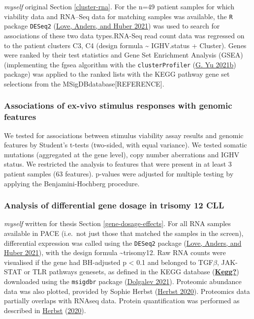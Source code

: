 \documentclass[11pt, a4paper, twosided]{book}
\begin{document}
\emph{myself} original
Section \ref{cluster-rna}. For the n=49 patient samples for which viability data and RNA--Seq data for matching samples was available, the \texttt{R} package \texttt{DESeq2} (\protect\hyperlink{ref-R-DESeq2}{Love, Anders, and Huber 2021}) was used to search for associations of these two data types.RNA-Seq read count data was regressed on to the patient clusters C3, C4 (design formula \textasciitilde{} IGHV.status + Cluster). Genes were ranked by their test statistics and Gene Set Enrichment Analysis (GSEA) (implementing the fgsea algorithm with the \texttt{clusterProfiler} (\protect\hyperlink{ref-R-clusterProfiler}{G. Yu 2021b}) package) was applied to the ranked lists with the KEGG pathway gene set selections from the MSigDBdatabase{[}REFERENCE{]}.

\hypertarget{associations-of-ex-vivo-stimulus-responses-with-genomic-features}{%
\subsubsection{Associations of ex-vivo stimulus responses with genomic features}\label{associations-of-ex-vivo-stimulus-responses-with-genomic-features}}

We tested for associations between stimulus viability assay results and genomic features by Student's t-tests (two-sided, with equal variance). We tested somatic mutations (aggregated at the gene level), copy number aberrations and IGHV status. We restricted the analysis to features that were present in at least 3 patient samples (63 features). p-values were adjusted for multiple testing by applying the Benjamini-Hochberg procedure.

\hypertarget{gene-dosage-effects-method}{%
\subsubsection{Analysis of differential gene dosage in trisomy 12 CLL}\label{gene-dosage-effects-method}}

\emph{myself} written for thesis
Section \ref{gene-dosage-effects}. For all RNA samples available in PACE (i.e.~not just those that matched the samples in the screen), differential expression was called using the \texttt{DESeq2} package (\protect\hyperlink{ref-R-DESeq2}{Love, Anders, and Huber 2021}), with the design formula \textasciitilde trisomy12. Raw RNA counts were visualised if the gene had BH-adjusted p \textless{} 0.1 and belonged to TGF\(\beta\), JAK-STAT or TLR pathways genesets, as defined in the KEGG database (\protect\hyperlink{ref-Kegg}{\textbf{Kegg?}}) downloaded using the \texttt{msigdbr} package (\protect\hyperlink{ref-R-msigdbr}{Dolgalev 2021}). Proteomic abundance data was also plotted, provided by Sophie Herbst (\protect\hyperlink{ref-HerbstThesis}{Herbst 2020}). Proteomics data partially overlaps with RNAseq data. Protein quantification was performed as described in \protect\hyperlink{ref-HerbstThesis}{Herbst} (\protect\hyperlink{ref-HerbstThesis}{2020}).
\end{document}
